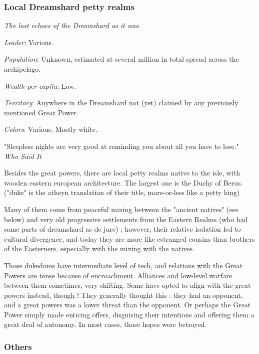  

\subsubsection{Local Dreamshard petty realms}

\textit{The last echoes of the Dreamshard as it was.}

\textit{Leader}: Various.

\textit{Population}: Unknown, estimated at several million in total spread across the archipelago.

\textit{Wealth per capita}: Low.

\textit{Territory}: Anywhere in the Dreamshard not (yet) claimed by any previously mentioned Great Power.
    
\textit{Colors}: Various. Mostly white.

\begin{rpg-quotebox}
    "Sleepless nights are very good at reminding you about all you have to lose." \\ \textendash \textit{Who Said It}
\end{rpg-quotebox}

Besides the great powers, there are local petty realms native to the isle, with wooden eastern european architecture. The largest one is the Duchy of Berus. ("duke" is the atheyn translation of their title, more-or-less like a petty king)

Many of them come from peaceful mixing between the "ancient natives" (see below) and very old progressive settlements from the Eastern Realms (who had some parts of dreamshard as de jure) ; however, their relative isolation led to cultural divergence, and today they are more like estranged cousins than brothers of the Easterners, especially with the mixing with the natives.

Those dukedoms have intermediate level of tech, and relations with the Great Powers are tense because of encroachment. Alliances and low-level warfare between them sometimes, very shifting. Some have opted to align with the great powers instead, though ! They generally thought this : they had an opponent, and a great powers was a lower threat than the opponent. Or perhaps the Great Power simply made enticing offers, disguising their intentions and offering them a great deal of autonomy. In most cases, those hopes were betrayed.
	

\subsubsection{Others}

